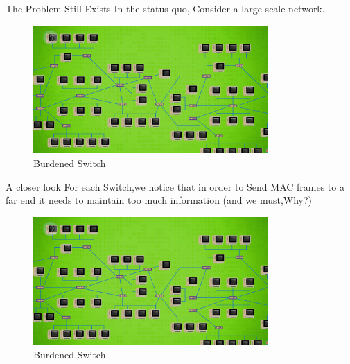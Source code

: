 \documentclass[UTF8]{ctexbeamer}
\begin{document}
\begin{frame}{The Problem Still Exists}
    In the status quo, Consider a large-scale network.
    \begin{figure}
        \centering
        \includegraphics[width=0.8\textwidth]{large-scale-ethernet.png}
        \caption{Burdened Switch}
    \end{figure}
    
\end{frame}

\begin{frame}{A closer look}
    For each Switch,we notice that in order to Send MAC frames to a far end it needs to maintain too much information (and we must,Why?)
    \begin{figure}
        \centering
        \includegraphics[width=0.8\textwidth]{large-scale-ethernet.png}
        \caption{Burdened Switch}
    \end{figure}
    
\end{frame}
\end{document}
